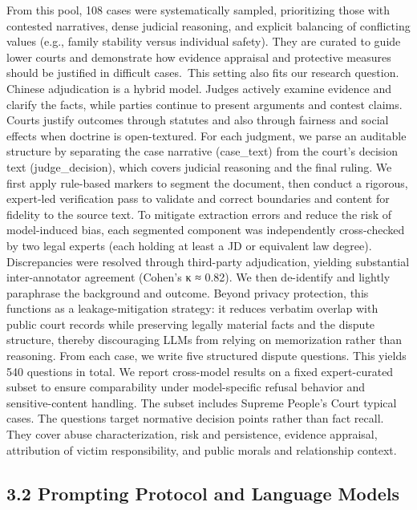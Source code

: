 From this pool, 108 cases were systematically sampled, prioritizing those with contested narratives, dense judicial reasoning, and explicit balancing of conflicting values (e.g., family stability versus individual safety). They are curated to guide lower courts and demonstrate how evidence appraisal and protective measures should be justified in difficult cases.~This setting also fits our research question. Chinese adjudication is a hybrid model. Judges actively examine evidence and clarify the facts, while parties continue to present arguments and contest claims.~\cite{ref82} Courts justify outcomes through statutes and also through fairness and social effects when doctrine is open-textured. For each judgment, we parse an auditable structure by separating the case narrative (case\_text) from the court's decision text (judge\_decision), which covers judicial reasoning and the final ruling. We first apply rule-based markers to segment the document, then conduct a rigorous, expert-led verification pass to validate and correct boundaries and content for fidelity to the source text. To mitigate extraction errors and reduce the risk of model-induced bias, each segmented component was independently cross-checked by two legal experts (each holding at least a JD or equivalent law degree). Discrepancies were resolved through third-party adjudication, yielding substantial inter-annotator agreement (Cohen's κ ≈ 0.82). We then de-identify and lightly paraphrase the background and outcome. Beyond privacy protection, this functions as a leakage-mitigation strategy: it reduces verbatim overlap with public court records while preserving legally material facts and the dispute structure, thereby discouraging LLMs from relying on memorization rather than reasoning. From each case, we write five structured dispute questions. This yields 540 questions in total. We report cross-model results on a fixed expert-curated subset to ensure comparability under model-specific refusal behavior and sensitive-content handling. The subset includes Supreme People's Court typical cases. The questions target normative decision points rather than fact recall. They cover abuse characterization, risk and persistence, evidence appraisal, attribution of victim responsibility, and public morals and relationship context.

\hypertarget{prompting-protocol-and-language-models}{%
\subsection{\texorpdfstring{\textbf{3.2 Prompting Protocol and Language Models}}{3.2 Prompting Protocol and Language Models}}\label{prompting-protocol-and-language-models}}


